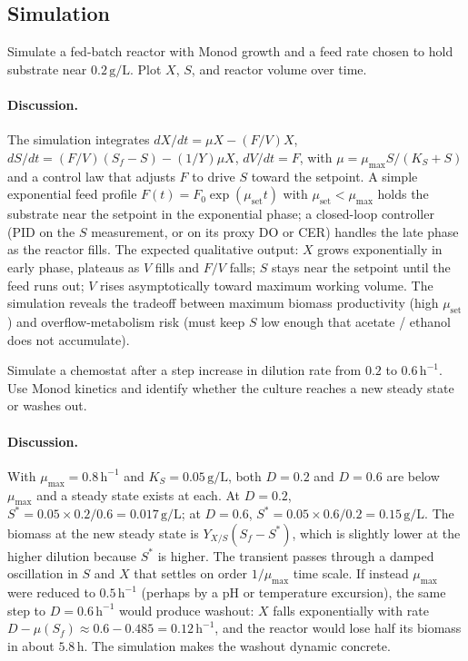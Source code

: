 \subsection*{Simulation}

\begin{exercise}
Simulate a fed-batch reactor with Monod growth and a feed rate chosen to
hold substrate near $0.2\,\text{g}/\text{L}$. Plot $X$, $S$, and
reactor volume over time.
\end{exercise}

\paragraph{Discussion.}
The simulation integrates
$dX/dt = \mu X - (F/V)X$, $dS/dt = (F/V)(S_f - S) - (1/Y)\mu X$,
$dV/dt = F$, with $\mu = \mu_{\max} S / (K_S + S)$ and a control law
that adjusts $F$ to drive $S$ toward the setpoint. A simple
exponential feed profile $F(t) = F_0 \exp(\mu_{\text{set}} t)$ with
$\mu_{\text{set}} < \mu_{\max}$ holds the substrate near the setpoint
in the exponential phase; a closed-loop controller (PID on the
$S$ measurement, or on its proxy DO or CER) handles the late phase as
the reactor fills. The expected qualitative output: $X$ grows
exponentially in early phase, plateaus as $V$ fills and $F/V$ falls;
$S$ stays near the setpoint until the feed runs out; $V$ rises
asymptotically toward maximum working volume. The simulation reveals
the tradeoff between maximum biomass productivity (high $\mu_{\text{set}}$)
and overflow-metabolism risk (must keep $S$ low enough that
acetate / ethanol does not accumulate).

\begin{exercise}
Simulate a chemostat after a step increase in dilution rate from
$0.2$ to $0.6\,\text{h}^{-1}$. Use Monod kinetics and identify whether
the culture reaches a new steady state or washes out.
\end{exercise}

\paragraph{Discussion.}
With $\mu_{\max} = 0.8\,\text{h}^{-1}$ and $K_S = 0.05\,\text{g}/\text{L}$,
both $D = 0.2$ and $D = 0.6$ are below $\mu_{\max}$ and a steady state
exists at each. At $D = 0.2$, $S^\ast = 0.05 \times 0.2/0.6 = 0.017\,\text{g/L}$;
at $D = 0.6$, $S^\ast = 0.05 \times 0.6/0.2 = 0.15\,\text{g/L}$. The
biomass at the new steady state is $Y_{X/S}(S_f - S^\ast)$, which is
slightly lower at the higher dilution because $S^\ast$ is higher. The
transient passes through a damped oscillation in $S$ and $X$ that
settles on order $1/\mu_{\max}$ time scale. If instead $\mu_{\max}$
were reduced to $0.5\,\text{h}^{-1}$ (perhaps by a pH or temperature
excursion), the same step to $D = 0.6\,\text{h}^{-1}$ would produce
washout: $X$ falls exponentially with rate $D - \mu(S_f) \approx
0.6 - 0.485 = 0.12\,\text{h}^{-1}$, and the reactor would lose half
its biomass in about $5.8\,\text{h}$. The simulation makes the
washout dynamic concrete.

